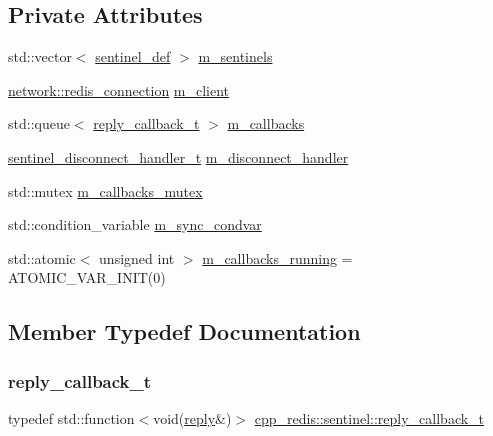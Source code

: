 \subsection*{Private Attributes}
\begin{DoxyCompactItemize}
\item 
std\+::vector$<$ \hyperlink{classcpp__redis_1_1sentinel_1_1sentinel__def}{sentinel\+\_\+def} $>$ \hyperlink{classcpp__redis_1_1sentinel_a3eea36960df4e9f8f7ef54c42a91e349}{m\+\_\+sentinels}
\item 
\hyperlink{classcpp__redis_1_1network_1_1redis__connection}{network\+::redis\+\_\+connection} \hyperlink{classcpp__redis_1_1sentinel_a2b5ba539516b144bcb83c0180bd392a4}{m\+\_\+client}
\item 
std\+::queue$<$ \hyperlink{classcpp__redis_1_1sentinel_ae1a150ff8787208c47414397a061c9a7}{reply\+\_\+callback\+\_\+t} $>$ \hyperlink{classcpp__redis_1_1sentinel_a12ce1c0a082ffdd718f0cc1d41d2339f}{m\+\_\+callbacks}
\item 
\hyperlink{classcpp__redis_1_1sentinel_a923e06b5b700c16dffec8a01d2fa9aa4}{sentinel\+\_\+disconnect\+\_\+handler\+\_\+t} \hyperlink{classcpp__redis_1_1sentinel_a02cf2496d322c407020962fcf0dccf53}{m\+\_\+disconnect\+\_\+handler}
\item 
std\+::mutex \hyperlink{classcpp__redis_1_1sentinel_a65f034fd5c96887ffa36383dd264b250}{m\+\_\+callbacks\+\_\+mutex}
\item 
std\+::condition\+\_\+variable \hyperlink{classcpp__redis_1_1sentinel_a069c52d386173818d4c0656b242107dd}{m\+\_\+sync\+\_\+condvar}
\item 
std\+::atomic$<$ unsigned int $>$ \hyperlink{classcpp__redis_1_1sentinel_ad2d1eeb81b039048af1cec7a25cda135}{m\+\_\+callbacks\+\_\+running} = A\+T\+O\+M\+I\+C\+\_\+\+V\+A\+R\+\_\+\+I\+N\+IT(0)
\end{DoxyCompactItemize}


\subsection{Member Typedef Documentation}
\mbox{\label{classcpp__redis_1_1sentinel_ae1a150ff8787208c47414397a061c9a7}} 
\subsubsection{\texorpdfstring{reply\+\_\+callback\+\_\+t}{reply\_callback\_t}}
{\footnotesize\ttfamily typedef std\+::function$<$void(\hyperlink{classcpp__redis_1_1reply}{reply}\&)$>$ \hyperlink{classcpp__redis_1_1sentinel_ae1a150ff8787208c47414397a061c9a7}{cpp\+\_\+redis\+::sentinel\+::reply\+\_\+callback\+\_\+t}}

